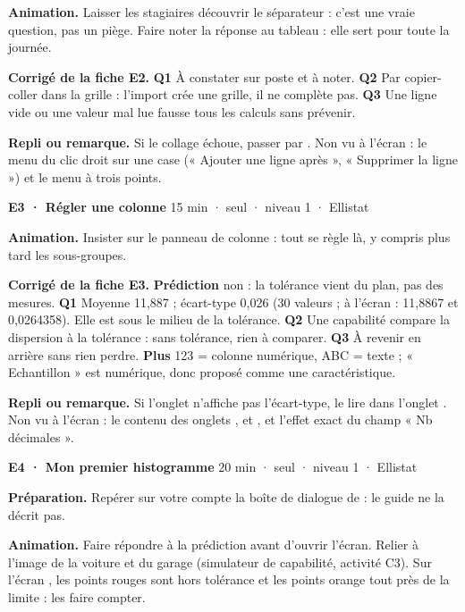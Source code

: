 \textbf{Animation.} Laisser les stagiaires découvrir le séparateur : c'est une vraie question, pas un piège. Faire noter la réponse au tableau : elle sert pour toute la journée.\par
\textbf{\color{ok}Corrigé de la fiche E2.} \textbf{Q1} À constater sur poste et à noter. \textbf{Q2} Par copier-coller dans la grille : l'import crée une grille, il ne complète pas. \textbf{Q3} Une ligne vide ou une valeur mal lue fausse tous les calculs sans prévenir.\par
{\small\textbf{Repli ou remarque.} Si le collage échoue, passer par . Non vu à l'écran : le menu du clic droit sur une case (« Ajouter une ligne après », « Supprimer la ligne ») et le menu à trois points.}\par
\vspace{3pt}
\begin{tcolorbox}[act]\textbf{E3 · Régler une colonne} \hfill {\small 15 min · seul · niveau 1 · Ellistat}\end{tcolorbox}
\textbf{Animation.} Insister sur le panneau de colonne : tout se règle là, y compris plus tard les sous-groupes.\par
\textbf{\color{ok}Corrigé de la fiche E3.} \textbf{Prédiction} non : la tolérance vient du plan, pas des mesures. \textbf{Q1} Moyenne 11,887 ; écart-type 0,026 (30 valeurs ; à l'écran : 11,8867 et 0,0264358). Elle est sous le milieu de la tolérance. \textbf{Q2} Une capabilité compare la dispersion à la tolérance : sans tolérance, rien à comparer. \textbf{Q3} À revenir en arrière sans rien perdre. \textbf{Plus} 123 = colonne numérique, ABC = texte ; « Echantillon » est numérique, donc proposé comme une caractéristique.\par
{\small\textbf{Repli ou remarque.} Si l'onglet  n'affiche pas l'écart-type, le lire dans l'onglet . Non vu à l'écran : le contenu des onglets ,  et , et l'effet exact du champ « Nb décimales ».}\par
\vspace{3pt}
\begin{tcolorbox}[act]\textbf{E4 · Mon premier histogramme} \hfill {\small 20 min · seul · niveau 1 · Ellistat}\end{tcolorbox}
\textbf{Préparation.} Repérer sur votre compte la boîte de dialogue de  : le guide ne la décrit pas.\par
\textbf{Animation.} Faire répondre à la prédiction avant d'ouvrir l'écran. Relier à l'image de la voiture et du garage (simulateur de capabilité, activité C3). Sur l'écran , les points rouges sont hors tolérance et les points orange tout près de la limite : les faire compter.\par

